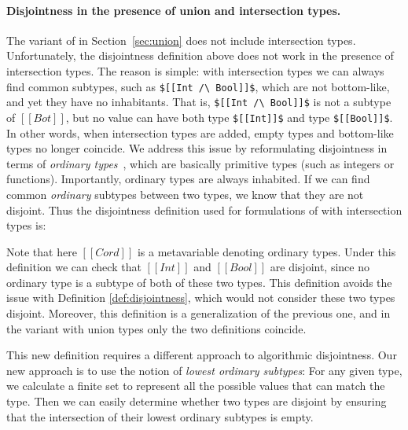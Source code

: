 \paragraph*{Disjointness in the presence of union and intersection types.}
The variant of \name in Section~\ref{sec:union} does not include intersection types.
Unfortunately, the disjointness definition above does not work in the presence of
intersection types. The reason is simple: with intersection types we can always find
common subtypes, such as \lstinline{$[[Int /\ Bool]]$}, which are not bottom-like, and yet
they have no inhabitants. That is,
\lstinline{$[[Int /\ Bool]]$} is not a subtype of $[[Bot]]$, but no value can have both type
\lstinline{$[[Int]]$} and type \lstinline{$[[Bool]]$}.
In other words, when intersection types are added, empty types
and bottom-like types no longer coincide.
We address this issue by reformulating
disjointness in terms of \textit{ordinary types}~\citep{davies2000intersection}, 
which are basically primitive types
(such as integers or functions).
Importantly, ordinary types are always inhabited.
If we can find common \emph{ordinary} subtypes between two types, we
know that they are not disjoint. Thus the disjointness definition
used for formulations of \name with intersection types is:

\begin{definition}[$[[/\]]$-Disjointness]
  \label{def:over:disj}
  A $*$ B $\Coloneqq$ $\nexists$ $[[Cord]]$, $[[Cord <: A]]$ and $[[Cord <: B]]$.
\end{definition}

\noindent Note that here $[[Cord]]$ is a metavariable denoting ordinary types.
Under this definition we can check that $[[Int]]$ and $[[Bool]]$ are disjoint,
since no ordinary type is a subtype of both of these two types. This definition avoids
the issue with Definition \ref{def:disjointness}, which would not consider these two types disjoint.
Moreover, this definition is a generalization of the previous one, and in the
variant with union types only the two definitions coincide.

This new definition requires a different approach to algorithmic disjointness. Our new
approach is to use the notion of \emph{lowest ordinary subtypes}:
For any given type, we calculate a finite set to represent all the possible
values that can match the type.
Then we can easily determine whether two types are disjoint
by ensuring that the intersection of their lowest ordinary subtypes is empty.

